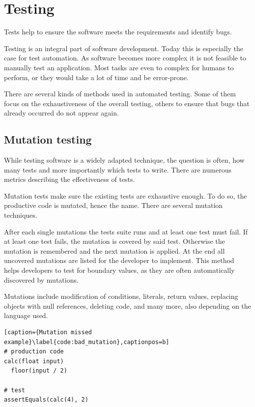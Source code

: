 \section{Testing}

Tests help to ensure the software meets the requirements and identify bugs.

Testing is an integral part of software development. Today this is especially
the case for test automation. As software becomes more complex it is not
feasible to manually test an application. Most tasks are even to complex for
humans to perform, or they would take a lot of time and be error-prone.

There are several kinds of methods used in automated testing. Some of them
focus on the exhaustiveness of the overall testing, others to ensure that bugs
that already occurred do not appear again.

\subsection{Mutation testing}

While testing software is a widely adapted technique, the question is often,
how many tests and more importantly which tests to write. There are numerous
metrics describing the effectiveness of tests.

Mutation tests make sure the existing tests are exhaustive enough. To do so,
the productive code is mutated, hence the name. There are several mutation
techniques.

After each single mutations the tests suite runs and at least one test must
fail. If at least one test fails, the mutation is covered by said test.
Otherwise the mutation is remembered and the next mutation is applied. At the
end all uncovered mutations are listed for the developer to implement. This
method helps developers to test for boundary values, as they are often
automatically discovered by mutations.

Mutations include modification of conditions, literals, return values,
replacing objects with null references, deleting code, and many more, also
depending on the language used.

\begin{lstlisting}[caption={Mutation missed example}\label{code:bad_mutation},captionpos=b]
# production code
calc(float input)
  floor(input / 2)

# test
assertEquals(calc(4), 2)
\end{lstlisting}

